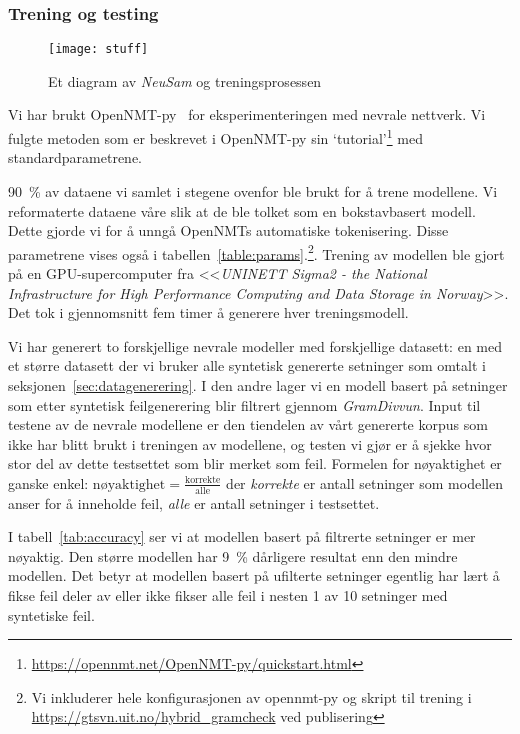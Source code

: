 \documentclass{flammie}
\begin{document}
\subsubsection{Trening og testing}

\begin{figure}
   \centering
   \texttt{[image: stuff]}
   \caption{Et diagram av \textit{NeuSam} og treningsprosessen \label{fig:my_label}}
\end{figure}

Vi har brukt OpenNMT-py~\cite{klein-etal-2017-opennmt} for eksperimenteringen
med nevrale nettverk. Vi fulgte metoden som er beskrevet i OpenNMT-py sin
`tutorial'\footnote{\url{https://opennmt.net/OpenNMT-py/quickstart.html}} med
standardparametrene.

90~\% av dataene vi samlet i stegene ovenfor ble brukt for å trene modellene. Vi
reformaterte dataene våre slik at de ble tolket som en bokstavbasert modell.
Dette gjorde vi for å unngå OpenNMTs automatiske tokenisering. Disse parametrene
vises også i tabellen~\ref{table:params}.\footnote{Vi inkluderer hele
konfigurasjonen av opennmt-py og skript til trening i
\url{https://gtsvn.uit.no/hybrid_gramcheck} ved publisering}. Trening av
modellen ble gjort på en GPU-supercomputer fra <<\textit{UNINETT Sigma2 - the
National Infrastructure for High Performance Computing and Data Storage in
Norway}>>. Det tok i gjennomsnitt fem timer å generere hver treningsmodell.

Vi har generert to forskjellige nevrale modeller med forskjellige datasett: en
med et større datasett der vi bruker alle syntetisk genererte setninger som
omtalt i seksjonen~\ref{sec:datagenerering}. I den andre lager vi en modell
basert på setninger som etter syntetisk feilgenerering blir filtrert gjennom
\textit{GramDivvun}.  Input til testene av de nevrale modellene er den tiendelen
av vårt genererte korpus som ikke har blitt brukt i treningen av modellene, og
testen vi gjør er å sjekke hvor stor del av dette testsettet som blir merket som
feil. Formelen for nøyaktighet er ganske enkel:
$\mathrm{nøyaktighet}=\frac{\mathrm{korrekte}}{\mathrm{alle}}$ der
\textit{korrekte} er antall setninger som modellen anser for å inneholde feil,
\textit{alle} er antall setninger i testsettet.


I tabell~\ref{tab:accuracy} ser vi at modellen basert på filtrerte setninger er
mer nøyaktig.  Den større modellen har 9~\% dårligere resultat enn den mindre
modellen.  Det betyr at modellen basert på ufilterte setninger egentlig har lært
å fikse feil deler av eller ikke fikser alle feil i nesten 1 av 10 setninger med
syntetiske feil.
\end{document}
